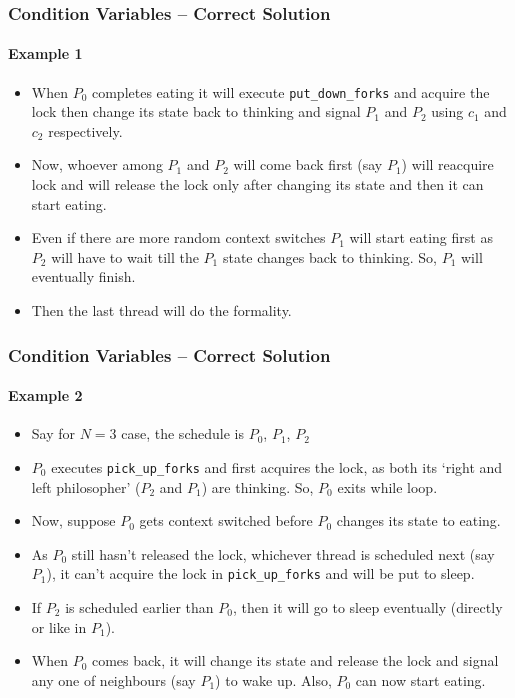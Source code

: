 \documentclass[aspectratio=169, handout, 10pt]{beamer}
\theoremstyle{example}
\begin{document}
\begin{frame}[fragile]\frametitle{Condition Variables -- Correct Solution}\framesubtitle{Example 1}
  \begin{example}[continued]
  \begin{itemize}
  \pause\item When $P_0$ completes eating it will execute \verb!put_down_forks! and acquire the lock then change its state back to thinking and signal $P_1$ and $P_2$ using $c_1$ and $c_2$ respectively.
  \pause\item Now, whoever among $P_1$ and $P_2$ will come back first (say $P_1$) will reacquire lock and will release the lock only after changing its state and then it can start eating.%
  \pause\item Even if there are more random context switches $P_1$ will start eating first as $P_2$ will have to wait till the $P_1$ state changes back to thinking. So, $P_1$ will eventually finish.
  \pause\item Then the last thread will do the formality.
  \end{itemize}
  \end{example}
\end{frame}
\begin{frame}[fragile]\frametitle{Condition Variables -- Correct Solution}\framesubtitle{Example 2}
  \begin{example}
  \begin{itemize}
  \pause\item Say for $N=3$ case, the schedule is $P_0$, $P_1$, $P_2$
  \pause\item $P_0$ executes \verb!pick_up_forks! and first acquires the lock, as both its `right and left philosopher' ($P_2$ and $P_1$) are thinking. So, $P_0$ exits while loop.
  \pause\item Now, suppose $P_0$ gets context switched before $P_0$ changes its state to eating.
  \pause\item As $P_0$ still hasn't released the lock, whichever thread is scheduled next (say $P_1$), it can't acquire the lock in \verb!pick_up_forks! and will be put to sleep. 
  \pause\item If $P_2$ is scheduled earlier than $P_0$, then it will go to sleep eventually (directly or like in $P_1$).
  \pause\item When $P_0$ comes back, it will change its state and release the lock and signal any one of neighbours (say $P_1$) to wake up. Also, $P_0$ can now start eating.
  \end{itemize}
  \end{example}
\end{frame}
\end{document}
